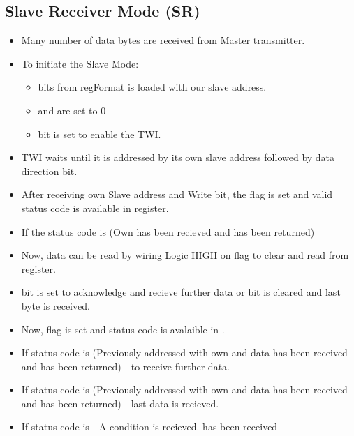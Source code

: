 \documentclass{article}
\begin{document}
\subsection{Slave Receiver Mode (SR)}
\begin{itemize}
    \item Many number of data bytes are received from Master transmitter.
    \item To initiate the Slave Mode:
    \begin{itemize}
        \item {} bits from  regFormat is loaded with our slave address.
        \item {} and  are set to 0
        \item {} bit is set to enable the TWI.
    \end{itemize}
    \item TWI waits until it is addressed by its own slave address followed by data direction bit.
    \item After receiving own Slave address and Write bit, the  flag is set and valid status code is available in  register.
    \item If the status code is  (Own  has been recieved and  has been returned)
    \item Now, data can be read by wiring Logic HIGH on  flag to clear and read from  register.
    \item {} bit is set to acknowledge and recieve further data or  bit is cleared and last byte is received.
    \item Now,  flag is set and status code is avalaible in .
    \item If status code is  (Previously addressed with own  and data has been received and  has been returned) - to receive further data.
    \item If status code is  (Previously addressed with own  and data has been received and  has been returned) - last data is recieved.
    \item If status code is  -  A  condition is recieved.
    has been received
\end{itemize}
\end{document}

